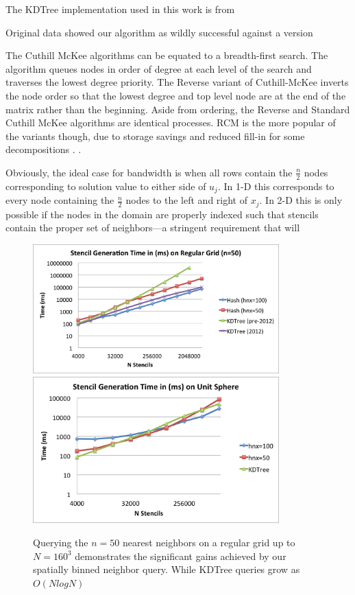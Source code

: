 \documentclass{report}
\begin{document}
The KDTree implementation used in this work is from 

Original data showed our algorithm as wildly successful against a version  

The Cuthill McKee algorithms can be equated to a breadth-first search. The algorithm queues nodes in order of degree at each level of the search and traverses the lowest degree priority. The Reverse variant of Cuthill-McKee inverts the node order so that the lowest degree and top level node are at the end of the matrix rather than the beginning. Aside from ordering, the Reverse and Standard Cuthill McKee algorithms are identical processes. RCM is the more popular of the variants though, due to storage savings and reduced fill-in for some decompositions \cite{LiuSherman1976}.	. 


Obviously, the ideal case for bandwidth is when all rows contain the $\frac{n}{2}$ nodes corresponding to solution value to either side of $u_j$. In 1-D this corresponds to every node containing the $\frac{n}{2}$ nodes to the left and right of $x_j$. In 2-D this is only possible if the nodes in the domain are properly indexed such that stencils contain the proper set of neighbors---a stringent requirement that will 


\begin{figure}
\centering
\includegraphics[width=9.5cm]{../figures/stencils/kdtree_old_reg_subsets_4m_stencil_gen_time.png}
\includegraphics[width=9.5cm]{../figures/stencils/sphere_subsets_1m_stencil_gen_time.png}
\caption{Querying the $n=50$ nearest neighbors on a regular grid up to $N=160^3$ demonstrates the significant gains achieved by our spatially binned neighbor query. While KDTree queries grow as $O(N log N)$}
\label{fig:hash_results}
\end{figure}
\end{document}
